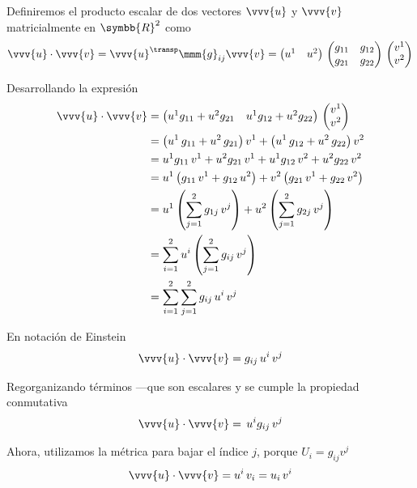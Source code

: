 Definiremos el producto escalar de dos vectores $\vvv{u}$ y $\vvv{v}$ matricialmente en
$\symbb{R}^2$ como
\begin{equation}
  \vvv{u}\cdot\vvv{v}
  = \vvv{u}^\transp  \mmm{g}_{ij} \vvv{v}
  = \begin{pmatrix}
    u^1 & u^2
  \end{pmatrix}
  \,\begin{pmatrix}
    g_{11} & g_{12}\\
    g_{21} & g_{22}
  \end{pmatrix}
  \,
  \begin{pmatrix}
    v^1\\
    v^2
  \end{pmatrix}
\end{equation}

Desarrollando la expresión
{\small
  \begin{align*}
    \vvv{u}\cdot\vvv{v}
    &=
      \begin{pmatrix}
        u^1 g_{11}+ u^2g_{21} & u^1g_{12}+ u^2g_{22}
      \end{pmatrix}
      \,
      \begin{pmatrix}
        v^1\\
        v^2
      \end{pmatrix}\\
    &=
      \left(u^1\,g_{11}+ u^2\,g_{21}\right) v^1+\left(u^1\,g_{12}+u^2\,g_{22}\right) v^2\\
    &=
      u^1g_{11}\,v^1 + u^2g_{21}\,v^1 + u^1g_{12}\,v^2 + u^2g_{22}\,v^2\\
    &=
      u^1\left(g_{11}\,v^1+g_{12}\,u^2\right) + v^2\left(g_{21}\,v^1+g_{22}\,v^2\right)\\
    &=
      u^1\left(\sum_{j=1}^2g_{1j}\,v^j\right) + u^2\left(\sum_{j=1}^2g_{2j}\,v^j\right)\\
    &=
      \sum_{i=1}^2 u^i \left(\sum_{j=1}^2g_{ij}\,v^j\right)\\
    &=
      \sum_{i=1}^2\sum_{j=1}^2g_{ij}\,u^i\,v^j
  \end{align*}
}

En notación de Einstein
\begin{equation}
  \vvv{u}\cdot\vvv{v}
  = g_{ij}\,u^i\,v^j
\end{equation}

Regorganizando términos ---que son escalares y se cumple la propiedad conmutativa
\[
  \vvv{u}\cdot\vvv{v}
  = \,u^ig_{ij}\,v^j
\]

Ahora, utilizamos la métrica para bajar el índice $j$, porque
$U_i = g_{ij}v^j$
\begin{equation}
  \vvv{u}\cdot\vvv{v}
  = u^i\,v_i = u_i\,v^i
\end{equation}


